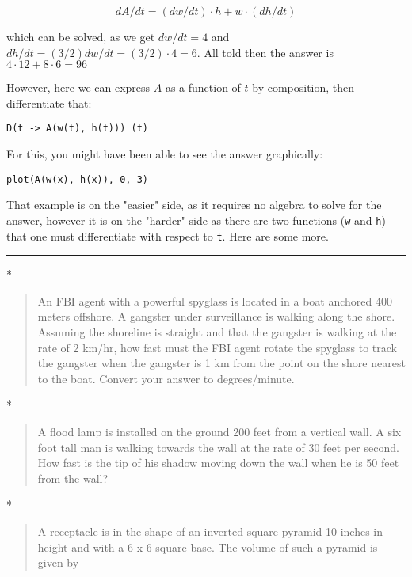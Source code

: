 \documentclass[12pt]{article}
\begin{document}
\[
dA/dt = (dw/dt) \cdot h + w \cdot (dh/dt)
\]

which can be solved, as we get $dw/dt = 4$ and
$dh/dt = (3/2)dw/dt = (3/2) \cdot 4 = 6$. All told then the answer is
$4\cdot 12 + 8 \cdot 6 = 96$

However, here we can express $A$ as a function of $t$ by composition,
then differentiate that:



\begin{verbatim}
D(t -> A(w(t), h(t))) (t)
\end{verbatim}
For this, you might have been able to see the answer graphically:



\begin{verbatim}
plot(A(w(x), h(x)), 0, 3)
\end{verbatim}
That example is on the "easier" side, as it requires no algebra to solve
for the answer, however it is on the "harder" side as there are two
functions (\texttt{w} and \texttt{h}) that one must differentiate with
respect to \texttt{t}. Here are some more.

\begin{center}\rule{3in}{0.4pt}\end{center}

*

\begin{quote}
An FBI agent with a powerful spyglass is located in a boat anchored 400
meters offshore. A gangster under surveillance is walking along the
shore. Assuming the shoreline is straight and that the gangster is
walking at the rate of 2 km/hr, how fast must the FBI agent rotate the
spyglass to track the gangster when the gangster is 1 km from the point
on the shore nearest to the boat. Convert your answer to degrees/minute.
\end{quote}

*

\begin{quote}
A flood lamp is installed on the ground 200 feet from a vertical wall. A
six foot tall man is walking towards the wall at the rate of 30 feet per
second. How fast is the tip of his shadow moving down the wall when he
is 50 feet from the wall?
\end{quote}

*

\begin{quote}
A receptacle is in the shape of an inverted square pyramid 10 inches in
height and with a 6 x 6 square base. The volume of such a pyramid is
given by
\end{quote}
\end{document}
